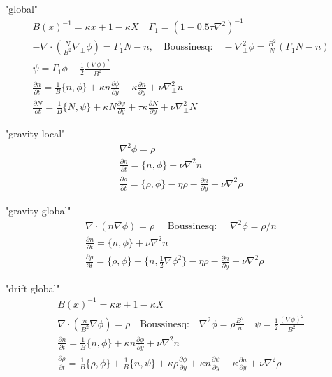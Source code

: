 "global"
\begin{subequations}
\begin{align}
B(x)^{-1} = \kappa x +1-\kappa X\quad \Gamma_1 = ( 1- 0.5\tau\nabla^2)^{-1}\\
 -\nabla\cdot \left(\frac{N}{B^2} \nabla_\perp \phi\right) = \Gamma_1 N-n, \quad
 \text{Boussinesq:}\quad -\nabla_\perp^2 \phi = \frac{B^2}{N} (\Gamma_1 N -n) \\
\psi = \Gamma_1 \phi - \frac{1}{2} \frac{(\nabla\phi)^2}{B^2}\\
 \frac{\partial n}{\partial t}     = 
    \frac{1}{B}\{ n, \phi\} 
  + \kappa n\frac{\partial \phi}{\partial y} 
  -\kappa \frac{\partial n}{\partial y}
  + \nu \nabla_\perp^2 n  \\
  \frac{\partial N}{\partial t} =
  \frac{1}{B}\{ N, \psi\} 
  + \kappa N\frac{\partial \psi}{\partial y} 
  + \tau \kappa\frac{\partial N}{\partial y} +\nu\nabla_\perp^2N
\end{align}
\end{subequations}

"gravity local"
\begin{subequations}
\begin{align}
 \nabla^2 \phi = \rho \\
 \frac{\partial n}{\partial t} = \{ n, \phi\} + \nu \nabla^2 n  \\
  \frac{\partial \rho}{\partial t} = \{ \rho, \phi\} - \eta \rho - \frac{\partial n}{\partial y} + \nu \nabla^2 \rho 
\end{align}
\end{subequations}


"gravity global"
\begin{subequations}
\begin{align}
 \nabla \cdot(n \nabla \phi) = \rho \quad\text{ Boussinesq: }\quad \nabla^2 \phi = \rho/n \\
 \frac{\partial n}{\partial t} = \{ n, \phi\} +  \nu \nabla^2 n  \\
  \frac{\partial \rho}{\partial t} = \{ \rho, \phi\} + \{n, \frac{1}{2} \nabla\phi^2\} - \eta \rho - \frac{\partial n}{\partial y} +\nu\nabla^2\rho 
\end{align}
\end{subequations}

"drift global"
\begin{subequations}
\begin{align}
B(x)^{-1} = \kappa x +1-\kappa X\\
 \nabla \cdot \left(\frac{n}{B^2} \nabla \phi\right) = \rho \quad
 \text{Boussinesq:}\quad \nabla^2\phi = \rho \frac{B^2}{n} \quad
\psi = \frac{1}{2} \frac{(\nabla\phi)^2}{B^2}\\
 \frac{\partial n}{\partial t}     = 
    \frac{1}{B}\{ n, \phi\} 
  + \kappa n\frac{\partial \phi}{\partial y} 
  + \nu \nabla^2 n  \\
  \frac{\partial \rho}{\partial t} =
  \frac{1}{B}\{ \rho, \phi\} 
  + \frac{1}{B}\{n, \psi\}
  + \kappa \rho\frac{\partial \phi}{\partial y} 
  + \kappa n\frac{\partial \psi}{\partial y}
  - \kappa\frac{\partial n}{\partial y} +\nu\nabla^2\rho 
\end{align}
\end{subequations}



